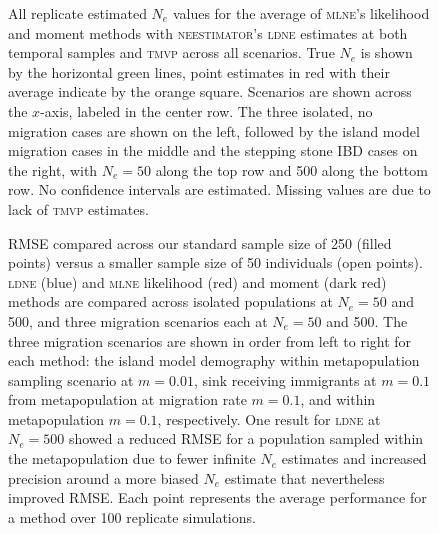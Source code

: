 \begin{landscape}
\begin{figure}[h!]
\centering
{}
\caption[All replicate estimated $N_e$ values for the average of \textsc{mlne}'s likelihood and moment methods with \textsc{neestimator}'s \textsc{ldne} estimates at both temporal samples and \textsc{tmvp} across all scenarios.]{All replicate estimated $N_e$ values for the average of \textsc{mlne}'s likelihood and moment methods with \textsc{neestimator}'s \textsc{ldne} estimates at both temporal samples and \textsc{tmvp} across all scenarios. True $N_e$ is shown by the horizontal green lines, point estimates in red with their average indicate by the orange square. Scenarios are shown across the $x$-axis, labeled in the center row. The three isolated, no migration cases are shown on the left, followed by the island model migration cases in the middle and the stepping stone IBD cases on the right, with $N_e = 50$ along the top row and 500 along the bottom row. No confidence intervals are estimated. Missing values are due to lack of \textsc{tmvp} estimates.}
\label{fig:supp_avg5}
\end{figure}



\end{landscape}






\begin{figure}[h!]
\centering
{}
\caption[RMSE compared across sample sizes.]{RMSE compared across our standard sample size of 250 (filled points) versus a smaller sample size of 50 individuals (open points). \textsc{ldne} (blue) and \textsc{mlne} likelihood (red) and moment (dark red) methods are compared across isolated populations at $N_e = 50$ and 500, and three migration scenarios each at $N_e = 50$ and 500. The three migration scenarios are shown in order from left to right for each method: the island model demography within metapopulation sampling scenario at $m = 0.01$, sink receiving immigrants at $m = 0.1$ from metapopulation at migration rate $m = 0.1$, and within metapopulation $m = 0.1$, respectively. One result for \textsc{ldne} at $N_e = 500$ showed a reduced RMSE for a population sampled within the metapopulation due to fewer infinite $N_e$ estimates and increased precision around a more biased $N_e$ estimate that nevertheless improved RMSE. Each point represents the average performance for a method over 100 replicate simulations.}
\label{fig:supp_rmsesamp}
\end{figure}



